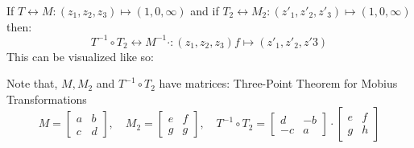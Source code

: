 \documentclass[a4paper, 10pt]{article}
\begin{document}
\begin{theorembox}
  \footnotesize If $T \longleftrightarrow M : (z_1, z_2, z_3) \mapsto (1,0,\infty)$ and if $T_2 \longleftrightarrow M_2: (z'_1, z'_2, z'_3) \mapsto (1,0,\infty)$ then:
  $$T^{-1} \circ T_2 \longleftrightarrow M^{-1} \cdot: (z_1, z_2, z_3) f\mapsto (z'_1, z'_2, z'3) $$
  This can be visualized like so:
  \begin{center}
  \end{center}
  Note that, $M, M_2$ and $T^{-1}\circ T_2$ have matrices: Three-Point Theorem for Mobius Transformations
  $$M = \begin{bmatrix} a&b \\ c &d \end{bmatrix}, \quad M_2 = \begin{bmatrix} e&f \\ g &g \end{bmatrix},
    \quad T^{-1} \circ T_2 =  \begin{bmatrix} d&-b \\ -c &a \end{bmatrix} \cdot \begin{bmatrix}e & f \\ g & h\end{bmatrix}$$
\end{theorembox}
\end{document}
